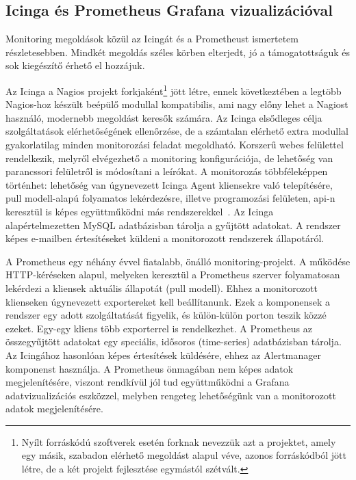 \subsection{Icinga és Prometheus Grafana vizualizációval}
Monitoring megoldások közül az Icingát és a Prometheust ismertetem részletesebben. Mindkét megoldás széles körben elterjedt, jó a támogatottságuk és sok kiegészítő érhető el hozzájuk.

Az Icinga a Nagios projekt forkjaként\footnote{Nyílt forráskódú szoftverek esetén forknak nevezzük azt a projektet, amely egy másik, szabadon elérhető megoldást alapul véve, azonos forráskódból jött létre, de a két projekt fejlesztése egymástól szétvált.} jött létre, ennek következtében a legtöbb Nagios-hoz készült beépülő modullal kompatibilis, ami nagy előny lehet a Nagiost használó, modernebb megoldást keresők számára. Az Icinga elsődleges célja szolgáltatások elérhetőségének ellenőrzése, de a számtalan elérhető extra modullal gyakorlatilag minden monitorozási feladat megoldható. Korszerű webes felülettel rendelkezik, melyről elvégezhető a monitoring konfigurációja, de lehetőség van parancssori felületről is módosítani a leírókat. A monitorozás többféleképpen történhet: lehetőség van úgynevezett Icinga Agent kliensekre való telepítésére, pull modell-alapú folyamatos lekérdezésre, illetve programozási felületen, \acrshort{api}-n keresztül is képes együttműködni más rendszerekkel~\cite{IcingaApi}. Az Icinga alapértelmezetten MySQL adatbázisban tárolja a gyűjtött adatokat. A rendszer képes e-mailben értesítéseket küldeni a monitorozott rendszerek állapotáról.

A Prometheus egy néhány évvel fiatalabb, önálló monitoring-projekt. A működése HTTP-kéréseken alapul, melyeken keresztül a Prometheus szerver folyamatosan lekérdezi a kliensek aktuális állapotát (pull modell). Ehhez a monitorozott klienseken úgynevezett exportereket kell beállítanunk. Ezek a komponensek a rendszer egy adott szolgáltatását figyelik, és külön-külön porton teszik közzé ezeket. Egy-egy kliens több exporterrel is rendelkezhet. A Prometheus az összegyűjtött adatokat egy speciális, idősoros (time-series) adatbázisban tárolja. Az Icingához hasonlóan képes értesítések küldésére, ehhez az Alertmanager komponenst használja. A Prometheus önmagában nem képes adatok megjelenítésére, viszont rendkívül jól tud együttműködni a Grafana adatvizualizációs eszközzel, melyben rengeteg lehetőségünk van a monitorozott adatok megjelenítésére.